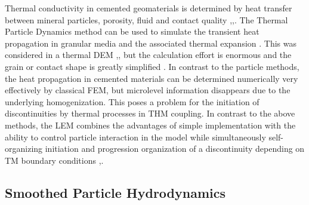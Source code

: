Thermal conductivity in cemented geomaterials is determined by heat transfer between mineral particles, porosity, fluid and contact quality 
\cite{Woodside19611688},\cite{Bahrami20063691},\cite{Widenfeld200315}.
The Thermal Particle Dynamics method can be used to simulate the transient heat propagation in granular media and the associated thermal expansion \cite{Vargas20011052}. This was considered in a thermal DEM \cite{Vargas20023119},\cite{Vargas2007}, but the calculation effort is enormous and the grain or contact shape is greatly simplified \cite{Zhang2011172}. In contrast to the particle methods, the heat propagation in cemented materials can be determined numerically very effectively by classical FEM, but microlevel information disappears due to the underlying homogenization. This poses a problem for the initiation of discontinuities by thermal processes in THM coupling. In contrast to the above methods, the LEM combines the advantages of simple implementation with the ability to control particle interaction in the model while simultaneously self-organizing initiation and progression organization of a discontinuity depending on TM boundary conditions \cite{Rizvi2016367},\cite{Wuttke201785}.

\subsection{Smoothed Particle Hydrodynamics}

